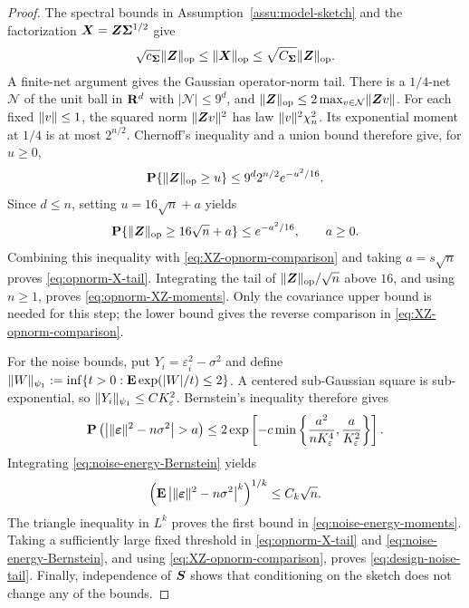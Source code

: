 \documentclass{article}
\theoremstyle{plain} %
\theoremstyle{definition} %
\theoremstyle{definition} %
\begin{document}
\begin{proof}
The spectral bounds in Assumption~\ref{assu:model-sketch} and the
factorization $\boldsymbol{X}=\boldsymbol{Z}\boldsymbol{\Sigma}^{1/2}$ give
\begin{align}
    \sqrt{c_{\boldsymbol{\Sigma}}}\lVert\boldsymbol{Z}\rVert_{\rm op}
    \leq \lVert\boldsymbol{X}\rVert_{\rm op}
    \leq \sqrt{C_{\boldsymbol{\Sigma}}}\lVert\boldsymbol{Z}\rVert_{\rm op}.
    \label{eq:XZ-opnorm-comparison}
\end{align}
A finite-net argument gives the Gaussian
operator-norm tail. There is a $1/4$-net $\mathcal N$ of the unit ball in
${\mathbf{R}}^d$ with $|\mathcal N|\leq9^d$, and
$\lVert\boldsymbol{Z}\rVert_{\rm op}\leq2\max_{v\in\mathcal N}\lVert\boldsymbol{Z} v\rVert$.
For each fixed $\lVert v\rVert\leq1$, the squared norm $\lVert\boldsymbol{Z} v\rVert^2$ has law
$\lVert v\rVert^2\chi_n^2$. Its exponential moment at $1/4$ is at most $2^{n/2}$.
Chernoff's inequality and a union bound therefore give, for $u\geq0$,
\begin{align*}
    {\mathbf{P}}\{\lVert\boldsymbol{Z}\rVert_{\rm op}\geq u\}
       \leq9^d2^{n/2}e^{-u^2/16}.
\end{align*}
Since $d\leq n$, setting $u=16\sqrt n+a$ yields
\begin{align*}
    {\mathbf{P}}\{\lVert\boldsymbol{Z}\rVert_{\rm op}\geq16\sqrt n+a\}
       \leq e^{-a^2/16},\qquad a\geq0.
\end{align*}
Combining this inequality with \eqref{eq:XZ-opnorm-comparison} and taking
$a=s\sqrt n$ proves \eqref{eq:opnorm-X-tail}. Integrating the tail of
$\lVert\boldsymbol{Z}\rVert_{\rm op}/\sqrt n$ above $16$, and using $n\geq1$, proves
\eqref{eq:opnorm-XZ-moments}. Only the covariance upper bound is needed
for this step; the lower bound gives the reverse comparison in
\eqref{eq:XZ-opnorm-comparison}.

For the noise bounds, put $Y_i=\varepsilon_i^2-\sigma^2$ and define
$\lVert W\rVert_{\psi_1}:=\inf\{t>0:{\mathbf{E}}\exp(|W|/t)\leq2\}$.
A centered sub-Gaussian square is
sub-exponential, so $\lVert Y_i\rVert_{\psi_1}\leq C K_\varepsilon^2$.
Bernstein's inequality therefore gives
\begin{align}
    \P\left(
       \left|\norm{\bep}^2-n\sigma^2\right|>a
    \right)
    \leq
    2\exp\left[
       -c\min\left\{
          \frac{a^2}{nK_\varepsilon^4},
          \frac{a}{K_\varepsilon^2}
       \right\}
    \right].
    \label{eq:noise-energy-Bernstein}
\end{align}
Integrating \eqref{eq:noise-energy-Bernstein} yields
\begin{align*}
    \left(
       {\mathbf{E}}\left|\lVert{\boldsymbol{\varepsilon} }\rVert^2-n\sigma^2\right|^k
    \right)^{1/k}
    \leq C_k\sqrt n.
\end{align*}
The triangle inequality in $L^k$ proves the first bound in
\eqref{eq:noise-energy-moments}.  Taking a sufficiently large fixed threshold
in \eqref{eq:opnorm-X-tail} and \eqref{eq:noise-energy-Bernstein}, and using
\eqref{eq:XZ-opnorm-comparison}, proves \eqref{eq:design-noise-tail}.
Finally, independence of $\boldsymbol{S}$ shows that conditioning on the sketch does not
change any of the bounds.
\end{proof}
\end{document}
